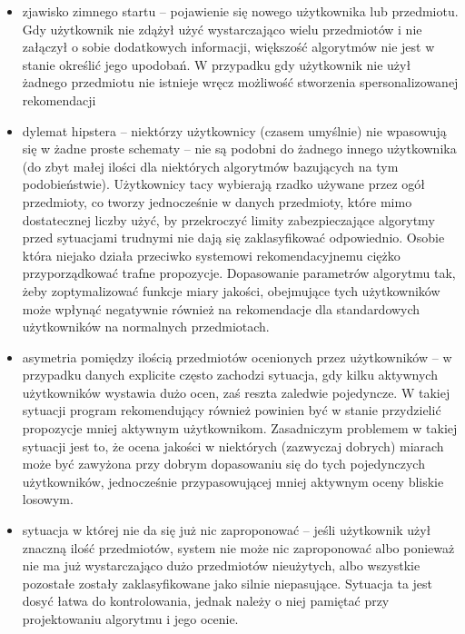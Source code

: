 \documentclass{pracamgr}
\begin{document}
   \begin{itemize}\itemsep1pt \parskip0pt 
    \item zjawisko zimnego startu -- pojawienie się nowego użytkownika lub przedmiotu.\newline
      Gdy użytkownik nie zdążył użyć wystarczająco wielu przedmiotów i nie załączył o sobie dodatkowych informacji,
      większość algorytmów nie jest w stanie określić jego upodobań.
      W przypadku gdy użytkownik nie użył żadnego przedmiotu nie istnieje wręcz możliwość stworzenia spersonalizowanej rekomendacji
    \item dylemat hipstera -- niektórzy użytkownicy (czasem umyślnie) nie wpasowują się w żadne proste schematy --
     nie są podobni do żadnego innego użytkownika (do zbyt małej ilości dla niektórych algorytmów bazujących na tym podobieństwie).\newline
     Użytkownicy tacy wybierają rzadko używane przez ogół przedmioty, co tworzy jednocześnie w danych przedmioty, które mimo dostatecznej liczby użyć,
     by przekroczyć limity zabezpieczające algorytmy przed sytuacjami trudnymi nie dają się zaklasyfikować odpowiednio.
     Osobie która niejako działa przeciwko systemowi rekomendacyjnemu ciężko przyporządkować trafne propozycje.
     Dopasowanie parametrów algorytmu tak, żeby zoptymalizować funkcje miary jakości,
     obejmujące tych użytkowników może wpłynąć negatywnie również na rekomendacje dla standardowych użytkowników na normalnych przedmiotach.
    \item asymetria pomiędzy ilością przedmiotów ocenionych przez użytkowników -- w przypadku danych explicite często zachodzi sytuacja,
     gdy kilku aktywnych użytkowników wystawia dużo ocen, zaś reszta zaledwie pojedyncze.\newline
     W takiej sytuacji program rekomendujący również powinien być w stanie przydzielić propozycje mniej aktywnym użytkownikom.
     Zasadniczym problemem w takiej sytuacji jest to, że ocena jakości w niektórych (zazwyczaj dobrych)
     miarach może być zawyżona przy dobrym dopasowaniu się do tych pojedynczych użytkowników,
     jednocześnie przypasowującej mniej aktywnym oceny bliskie losowym.
    \item sytuacja w której nie da się już nic zaproponować -- jeśli użytkownik użył znaczną ilość przedmiotów,
     system nie może nic zaproponować albo ponieważ nie ma już wystarczająco dużo przedmiotów nieużytych,
     albo wszystkie pozostałe zostały zaklasyfikowane jako silnie niepasujące.\newline
     Sytuacja ta jest dosyć łatwa do kontrolowania, jednak należy o niej pamiętać przy projektowaniu algorytmu i jego ocenie. 
   \end{itemize}
\end{document}

